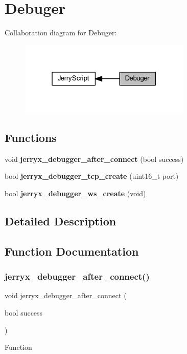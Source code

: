 \section{Debuger}
\label{group___debuger}
Collaboration diagram for Debuger\+:
\nopagebreak
\begin{figure}[H]
\begin{center}
\leavevmode
\includegraphics[width=232pt]{group___debuger}
\end{center}
\end{figure}
\subsection*{Functions}
\begin{DoxyCompactItemize}
\item 
void \textbf{ jerryx\+\_\+debugger\+\_\+after\+\_\+connect} (bool success)
\item 
\mbox{\label{group___debuger_ga98dcfa19d685f7910971b18ec1796adb}} 
bool {\bfseries jerryx\+\_\+debugger\+\_\+tcp\+\_\+create} (uint16\+\_\+t port)
\item 
\mbox{\label{group___debuger_ga062084ccde29b87c1b0820a5bb63ab9e}} 
bool {\bfseries jerryx\+\_\+debugger\+\_\+ws\+\_\+create} (void)
\end{DoxyCompactItemize}


\subsection{Detailed Description}


\subsection{Function Documentation}
\mbox{\label{group___debuger_ga6ef3f9c3a4379e9500b7801defb1d624}} 
\subsubsection{jerryx\_debugger\_after\_connect()}
{\footnotesize\ttfamily void jerryx\+\_\+debugger\+\_\+after\+\_\+connect (\begin{DoxyParamCaption}\item[{bool}]{success }\end{DoxyParamCaption})}

Function 